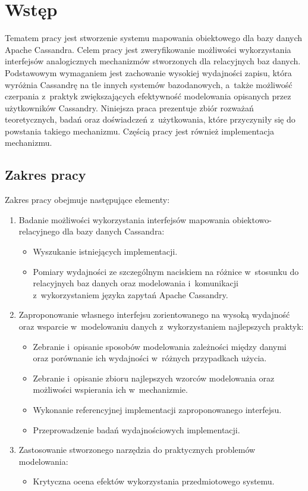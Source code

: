 
\chapter{Wstęp}

Tematem pracy jest stworzenie systemu mapowania obiektowego dla bazy danych Apache Cassandra. Celem pracy jest zweryfikowanie możliwości wykorzystania interfejsów analogicznych mechanizmów stworzonych dla relacyjnych baz danych. Podstawowym wymaganiem jest zachowanie wysokiej wydajności zapisu, która wyróżnia Cassandrę na tle innych systemów bazodanowych, a~także możliwość czerpania z~praktyk zwiększających efektywność modelowania opisanych przez użytkowników Cassandry. Niniejsza praca prezentuje zbiór rozważań teoretycznych, badań oraz doświadczeń z~użytkowania, które przyczyniły się do powstania takiego mechanizmu. Częścią pracy jest również implementacja mechanizmu. 

\section{Zakres pracy}

Zakres pracy obejmuje następujące elementy:

\begin{enumerate}
	\item Badanie możliwości wykorzystania interfejsów mapowania obiektowo-relacyjnego dla bazy danych Cassandra:
		\begin{itemize}
			\item Wyszukanie istniejących implementacji.
			\item Pomiary wydajności ze szczególnym naciskiem na różnice w~stosunku do relacyjnych baz danych oraz modelowania i~komunikacji z~wykorzystaniem języka zapytań Apache Cassandry.
		\end{itemize}
	\item Zaproponowanie własnego interfejsu zorientowanego na wysoką wydajność oraz wsparcie w~modelowaniu danych z~wykorzystaniem najlepszych praktyk:
		\begin{itemize}
			\item Zebranie i~opisanie sposobów modelowania zależności między danymi oraz porównanie ich wydajności w~różnych przypadkach użycia.
			\item Zebranie i~opisanie zbioru najlepszych wzorców modelowania oraz możliwości wspierania ich w~mechanizmie.
			\item Wykonanie referencyjnej implementacji zaproponowanego interfejsu.
			\item Przeprowadzenie badań wydajnościowych implementacji.
		\end{itemize}
	\item Zastosowanie stworzonego narzędzia do praktycznych problemów modelowania:
		\begin{itemize}
			\item Krytyczna ocena efektów wykorzystania przedmiotowego systemu.
		\end{itemize}
\end{enumerate}

